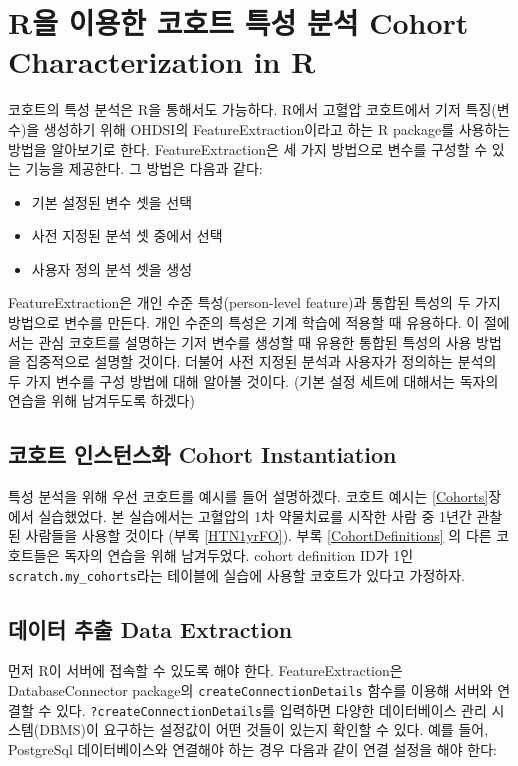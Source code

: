 \documentclass[11pt]{book}
\providecommand{\tightlist}{%
  \setlength{\itemsep}{0pt}\setlength{\parskip}{0pt}}
\theoremstyle{definition}
\theoremstyle{definition}
\theoremstyle{definition}
\theoremstyle{remark}
\begin{document}
\section{R을 이용한 코호트 특성 분석 Cohort Characterization in
R}\label{r-----cohort-characterization-in-r}

코호트의 특성 분석은 R을 통해서도 가능하다. R에서 고혈압 코호트에서 기저
특징(변수)을 생성하기 위해 OHDSI의 FeatureExtraction이라고 하는 R
package를 사용하는 방법을 알아보기로 한다. FeatureExtraction은 세 가지
방법으로 변수를 구성할 수 있는 기능을 제공한다. 그 방법은 다음과 같다:

\begin{itemize}
\tightlist
\item
  기본 설정된 변수 셋을 선택
\item
  사전 지정된 분석 셋 중에서 선택
\item
  사용자 정의 분석 셋을 생성
\end{itemize}

FeatureExtraction은 개인 수준 특성(person-level feature)과 통합된 특성의
두 가지 방법으로 변수를 만든다. 개인 수준의 특성은 기계 학습에 적용할 때
유용하다. 이 절에서는 관심 코호트를 설명하는 기저 변수를 생성할 때
유용한 통합된 특성의 사용 방법을 집중적으로 설명할 것이다. 더불어 사전
지정된 분석과 사용자가 정의하는 분석의 두 가지 변수를 구성 방법에 대해
알아볼 것이다. (기본 설정 세트에 대해서는 독자의 연습을 위해 남겨두도록
하겠다)

\subsection{코호트 인스턴스화 Cohort
Instantiation}\label{--cohort-instantiation}

특성 분석을 위해 우선 코호트를 예시를 들어 설명하겠다. 코호트 예시는
\ref{Cohorts}장에서 실습했었다. 본 실습에서는 고혈압의 1차 약물치료를
시작한 사람 중 1년간 관찰된 사람들을 사용할 것이다 (부록
\ref{HTN1yrFO}). 부록 \ref{CohortDefinitions} 의 다른 코호트들은 독자의
연습을 위해 남겨두었다. cohort definition ID가 1인
\texttt{scratch.my\_cohorts}라는 테이블에 실습에 사용할 코호트가 있다고
가정하자.

\subsection{데이터 추출 Data Extraction}\label{--data-extraction}

먼저 R이 서버에 접속할 수 있도록 해야 한다. FeatureExtraction은
DatabaseConnector package의 \texttt{createConnectionDetails} 함수를
이용해 서버와 연결할 수 있다. \texttt{?createConnectionDetails}를
입력하면 다양한 데이터베이스 관리 시스템(DBMS)이 요구하는 설정값이 어떤
것들이 있는지 확인할 수 있다. 예를 들어, PostgreSql 데이터베이스와
연결해야 하는 경우 다음과 같이 연결 설정을 해야 한다:
\end{document}
